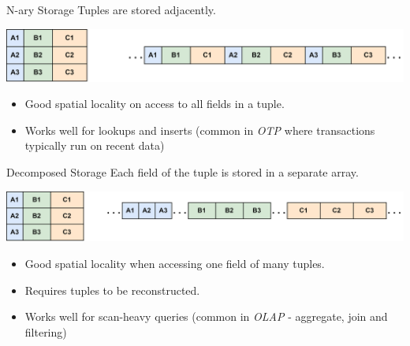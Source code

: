 \begin{definitionbox}{N-ary Storage}
    Tuples are stored adjacently.
    \begin{center}
        \includegraphics[width=.8\textwidth]{storage/images/nary_layout.drawio.png}
    \end{center}
    \begin{itemize}
        \item Good spatial locality on access to all fields in a tuple.
        \item Works well for lookups and inserts (common in \textit{OTP} where transactions typically run on recent data)
    \end{itemize}
\end{definitionbox}

\begin{definitionbox}{Decomposed Storage}
    Each field of the tuple is stored in a separate array.
    \begin{center}
        \includegraphics[width=.8\textwidth]{storage/images/decomposed_layout.drawio.png}
    \end{center}
    \begin{itemize}
        \item Good spatial locality when accessing one field of many tuples.
        \item Requires tuples to be reconstructed.
        \item Works well for scan-heavy queries (common in \textit{OLAP} - aggregate, join and filtering)
    \end{itemize}
\end{definitionbox}

